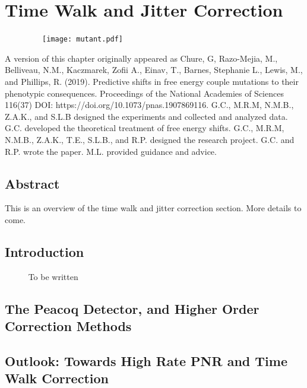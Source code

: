 \documentclass[12pt]{caltech_thesis}
\begin{document}
\hypertarget{time-walk-and-jitter-correction}{%
\chapter{Time Walk and Jitter
Correction}\label{time-walk-and-jitter-correction}}

~~~~~~~~~\texttt{[image: mutant.pdf]}

A version of this chapter originally appeared as Chure, G, Razo-Mejia,
M., Belliveau, N.M., Kaczmarek, Zofii A., Einav, T., Barnes, Stephanie
L., Lewis, M., and Phillips, R. (2019). Predictive shifts in free energy
couple mutations to their phenotypic consequences. Proceedings of the
National Academies of Sciences 116(37) DOI:
https://doi.org/10.1073/pnas.1907869116. G.C., M.R.M, N.M.B., Z.A.K.,
and S.L.B designed the experiments and collected and analyzed data. G.C.
developed the theoretical treatment of free energy shifts. G.C., M.R.M,
N.M.B., Z.A.K., T.E., S.L.B., and R.P. designed the research project.
G.C. and R.P. wrote the paper. M.L. provided guidance and advice.

\hypertarget{abstract-2}{%
\section{Abstract}\label{abstract-2}}

This is an overview of the time walk and jitter correction section. More
details to come.

\hypertarget{introduction-2}{%
\section{Introduction}\label{introduction-2}}

~~~~~ To be written

\hypertarget{the-peacoq-detector-and-higher-order-correction-methods}{%
\section{The Peacoq Detector, and Higher Order Correction
Methods}\label{the-peacoq-detector-and-higher-order-correction-methods}}

\hypertarget{outlook-towards-high-rate-pnr-and-time-walk-correction}{%
\section{Outlook: Towards High Rate PNR and Time Walk
Correction}\label{outlook-towards-high-rate-pnr-and-time-walk-correction}}
\end{document}
